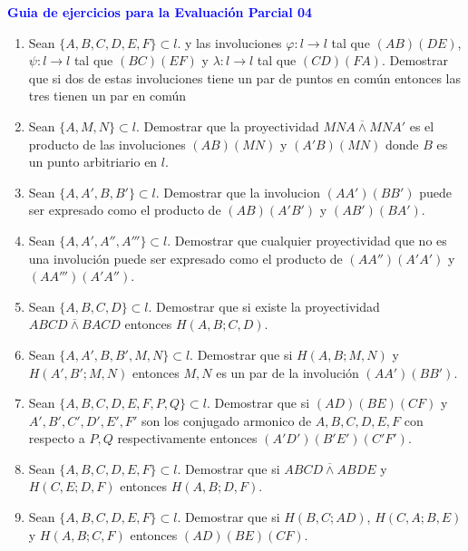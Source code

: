 \documentclass[12pts]{report}
\begin{document}
\begin{center}
\textcolor{blue}{\textbf{\large Guia de ejercicios para la Evaluación Parcial 04 }}\\
\vspace{0.5 cm}
\end{center}


\begin{center}
\end{center}

\begin{enumerate}
\item Sean $\{A,B,C,D,E,F\}\subset l$. y las involuciones $\varphi: l\to l$ tal que $(AB)(DE)$, $\psi: l\to l$ tal que $(BC)(EF)$ y $\lambda: l\to l$ tal que $(CD)(FA)$. Demostrar que si dos de estas involuciones tiene un par de puntos en común entonces las tres tienen un par en común

\item Sean $\{A,M,N\}\subset l$. Demostrar que la proyectividad $MNA\overline{\wedge} MNA'$ es el producto de las involuciones $(AB)(MN)$ y $(A'B)(MN)$ donde $B$ es un punto arbitriario en $l$.

\item Sean $\{A,A',B,B'\}\subset l$. Demostrar que la involucion $(AA')(BB')$ puede ser expresado como el producto de $(AB)(A'B')$ y $(AB')(BA')$.

\item Sean $\{A,A',A'',A'''\}\subset l$. Demostrar que cualquier proyectividad que no es una involución puede ser expresado como el producto de $(AA'')(A'A')$ y $(AA''')(A'A'')$.

\item Sean $\{A,B,C,D\}\subset l$. Demostrar que si existe la proyectividad $ABCD \overline{\wedge} BACD$ entonces $H(A,B; C,D)$.

\item Sean $\{A,A',B,B',M,N\}\subset l$. Demostrar que si $H(A,B; M,N)$ y $H(A',B';M,N)$ entonces $M,N$ es un par de la involución $(AA')(BB')$.

\item Sean $\{A,B,C,D,E,F, P,Q\}\subset l$. Demostrar que si $(AD)(BE)(CF)$ y $A',B',C',D',E', F'$ son los conjugado armonico de $A,B,C,D,E,F$ con respecto a $P, Q$  respectivamente entonces $(A'D')(B'E')(C'F')$.

\item Sean $\{A,B,C,D,E,F\}\subset l$. Demostrar que si $ABCD \overline{\wedge} ABDE$ y $H(C,E;D,F)$ entonces $H(A,B;D,F)$.

\item Sean $\{A,B,C,D,E,F\}\subset l$. Demostrar que si $H(B,C;AD)$, $H(C,A;B,E)$ y $H(A,B;C,F)$ entonces $(AD)(BE)(CF)$.
\end{enumerate}
\end{document}
